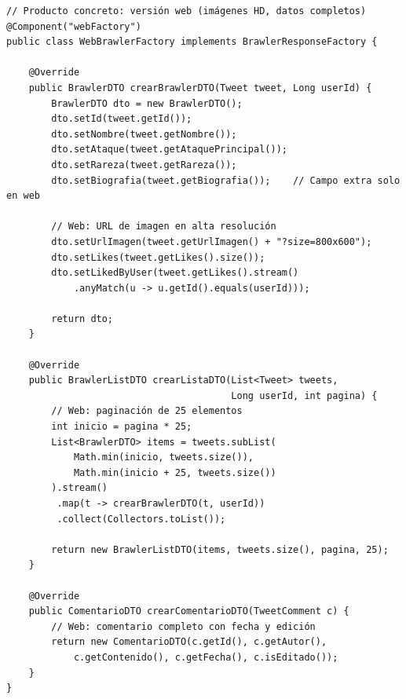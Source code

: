 \documentclass[12pt,a4paper]{article}
\begin{document}
\begin{lstlisting}[caption={WebBrawlerFactory.java -- Factory concreta para web}]
// Producto concreto: versión web (imágenes HD, datos completos)
@Component("webFactory")
public class WebBrawlerFactory implements BrawlerResponseFactory {

    @Override
    public BrawlerDTO crearBrawlerDTO(Tweet tweet, Long userId) {
        BrawlerDTO dto = new BrawlerDTO();
        dto.setId(tweet.getId());
        dto.setNombre(tweet.getNombre());
        dto.setAtaque(tweet.getAtaquePrincipal());
        dto.setRareza(tweet.getRareza());
        dto.setBiografia(tweet.getBiografia());    // Campo extra solo en web

        // Web: URL de imagen en alta resolución
        dto.setUrlImagen(tweet.getUrlImagen() + "?size=800x600");
        dto.setLikes(tweet.getLikes().size());
        dto.setLikedByUser(tweet.getLikes().stream()
            .anyMatch(u -> u.getId().equals(userId)));

        return dto;
    }

    @Override
    public BrawlerListDTO crearListaDTO(List<Tweet> tweets,
                                        Long userId, int pagina) {
        // Web: paginación de 25 elementos
        int inicio = pagina * 25;
        List<BrawlerDTO> items = tweets.subList(
            Math.min(inicio, tweets.size()),
            Math.min(inicio + 25, tweets.size())
        ).stream()
         .map(t -> crearBrawlerDTO(t, userId))
         .collect(Collectors.toList());

        return new BrawlerListDTO(items, tweets.size(), pagina, 25);
    }

    @Override
    public ComentarioDTO crearComentarioDTO(TweetComment c) {
        // Web: comentario completo con fecha y edición
        return new ComentarioDTO(c.getId(), c.getAutor(),
            c.getContenido(), c.getFecha(), c.isEditado());
    }
}
\end{lstlisting}
\end{document}
